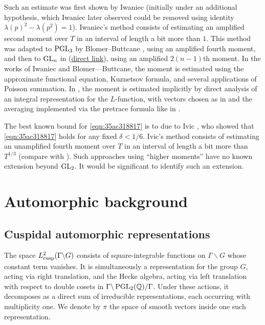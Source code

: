 \documentclass[reqno]{amsart} 
\numberwithin{equation}{section}
\begin{document}
Such an estimate was first shown by Iwaniec \cite{Iwaniec1992} (initially under an additional hypothesis, which Iwaniec later observed could be removed using identity $\lambda(p)^2 - \lambda(p^2) = 1$).  Iwaniec's method consists of estimating an amplified second moment over $T$ in an interval of length a bit more than $1$.  This method was adapted to $\operatorname{PGL}_3$ by Blomer--Buttcane \cite{MR4203038, MR4039487}, using an amplified fourth moment, and then to $\operatorname{GL}_n$ in \cite{2021arXiv210915230N}  (\href{standard.pdf}{direct link}), using an amplified $2(n-1)$th moment.  In the works of Iwaniec and Blomer---Buttcane, the moment is estimated using the approximate functional equation, Kuznetsov formula, and several applications of Poisson summation.  In \cite{2021arXiv210915230N}, the moment is estimated implicitly by direct analysis of an integral representation for the $L$-function, with vectors chosen as in \cite{nelson-venkatesh-1} and the averaging implemented via the pretrace formula like in \cite{iwan-sar}.

\begin{remark}
  The best known bound for \eqref{eqn:35ac318817} is to due to Ivic \cite{MR1879668} , who showed that \eqref{eqn:35ac318817} holds for any fixed $\delta < 1/6$.  Ivic's method consists of estimating an unamplified fourth moment over $T$ in an interval of length a bit more than $T^{1/3}$ (compare with \cite{michel-2009, Nelson-EisCubic, 2021arXiv210112106B, balkanova2022weyls}).  Such approaches using ``higher moments'' have no known extension beyond $\operatorname{GL}_2$.  It would be significant to identify such an extension.
\end{remark}

\section{Automorphic background}\label{sec:35ac3e5876}

\subsection{Cuspidal automorphic representations}\label{sec:35ac3e5878}
The space $L^2_{\operatorname{cusp}}(\Gamma \backslash G)$ consists of square-integrable functions on $\Gamma \backslash G$ whose constant term vanishes.  It is simultaneously a representation for the group $G$, acting via right translation, and the Hecke algebra, acting via left translation with respect to double cosets in $\Gamma \backslash \operatorname{PGL}_2(\mathbb{Q}) / \Gamma$.  Under these actions, it decomposes as a direct sum of irreducible representations, each occurring with multiplicity one.  We denote by $\pi$ the space of smooth vectors inside one such representation.
\end{document}
